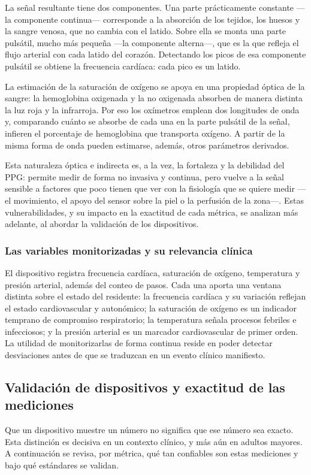 \documentclass[12pt,a4paper]{article}
\begin{document}
    La señal resultante tiene dos componentes. Una parte prácticamente constante —la componente continua— corresponde a la absorción de los tejidos, los huesos y la sangre venosa, que no cambia con el latido. Sobre ella se monta una parte pulsátil, mucho más pequeña —la componente alterna—, que es la que refleja el flujo arterial con cada latido del corazón. Detectando los picos de esa componente pulsátil se obtiene la frecuencia cardíaca: cada pico es un latido.

    La estimación de la saturación de oxígeno se apoya en una propiedad óptica de la sangre: la hemoglobina oxigenada y la no oxigenada absorben de manera distinta la luz roja y la infrarroja. Por eso los oxímetros emplean dos longitudes de onda y, comparando cuánto se absorbe de cada una en la parte pulsátil de la señal, infieren el porcentaje de hemoglobina que transporta oxígeno. A partir de la misma forma de onda pueden estimarse, además, otros parámetros derivados.

    Esta naturaleza óptica e indirecta es, a la vez, la fortaleza y la debilidad del PPG: permite medir de forma no invasiva y continua, pero vuelve a la señal sensible a factores que poco tienen que ver con la fisiología que se quiere medir —el movimiento, el apoyo del sensor sobre la piel o la perfusión de la zona—. Estas vulnerabilidades, y su impacto en la exactitud de cada métrica, se analizan más adelante, al abordar la validación de los dispositivos.

    \subsubsection{Las variables monitorizadas y su relevancia clínica}
    El dispositivo registra frecuencia cardíaca, saturación de oxígeno, temperatura y presión arterial, además del conteo de pasos. Cada una aporta una ventana distinta sobre el estado del residente: la frecuencia cardíaca y su variación reflejan el estado cardiovascular y autonómico; la saturación de oxígeno es un indicador temprano de compromiso respiratorio; la temperatura señala procesos febriles e infecciosos; y la presión arterial es un marcador cardiovascular de primer orden. La utilidad de monitorizarlas de forma continua reside en poder detectar desviaciones antes de que se traduzcan en un evento clínico manifiesto.

    \subsection{Validación de dispositivos y exactitud de las mediciones}
    Que un dispositivo muestre un número no significa que ese número sea exacto. Esta distinción es decisiva en un contexto clínico, y más aún en adultos mayores. A continuación se revisa, por métrica, qué tan confiables son estas mediciones y bajo qué estándares se validan.
\end{document}

